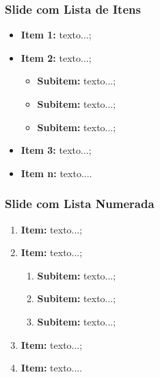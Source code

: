 \begin{frame}

    \frametitle{Slide com Lista de Itens}
    
    \begin{itemize}
       	\item \textbf{Item 1:} texto...;
       	\item \textbf{Item 2:} texto...;
       	\begin{itemize}
       		\item \textbf{Subitem:} texto...;
       		\item \textbf{Subitem:} texto...;
       		\item \textbf{Subitem:} texto...;
       	\end{itemize}
       	\item \textbf{Item 3:} texto...;
       	\item \textbf{Item n:} texto....
    \end{itemize}
         
\end{frame}


\begin{frame}

    \frametitle{Slide com Lista Numerada}
    
    \begin{enumerate}
       	\item \textbf{Item:} texto...;
       	\item \textbf{Item:} texto...;
       	\begin{enumerate}
       		\item \textbf{Subitem:} texto...;
       		\item \textbf{Subitem:} texto...;
       		\item \textbf{Subitem:} texto...;
       	\end{enumerate}
       	\item \textbf{Item:} texto...;
       	\item \textbf{Item:} texto....
    \end{enumerate}
         
\end{frame}


